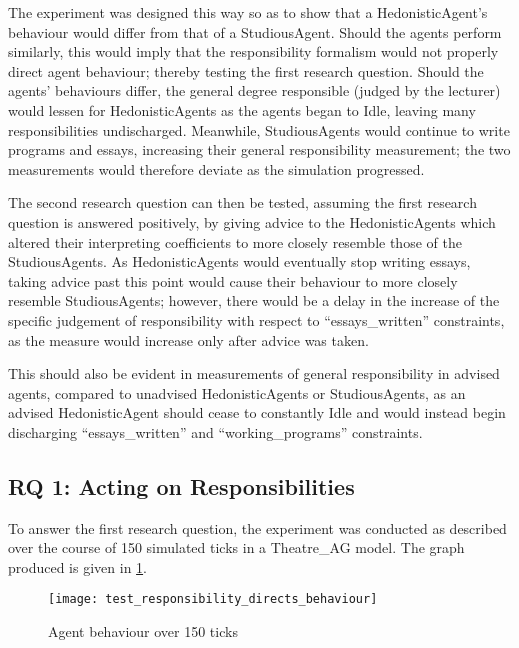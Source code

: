 The experiment was designed this way so as to show that a HedonisticAgent's behaviour would differ from that of a StudiousAgent. Should the agents perform similarly, this would imply that the responsibility formalism would not properly direct agent behaviour; thereby testing the first research question. Should the agents' behaviours differ, the general degree responsible (judged by the lecturer) would lessen for HedonisticAgents as the agents began to Idle, leaving many responsibilities undischarged. Meanwhile, StudiousAgents would continue to write programs and essays, increasing their general responsibility measurement; the two measurements would therefore deviate as the simulation progressed.\par

The second research question can then be tested, assuming the first research question is answered positively, by giving advice to the HedonisticAgents which altered their interpreting coefficients to more closely resemble those of the StudiousAgents. As HedonisticAgents would eventually stop writing essays, taking advice past this point would cause their behaviour to more closely resemble StudiousAgents; however, there would be a delay in the increase of the specific judgement of responsibility with respect to ``essays\_written'' constraints, as the measure would increase only after advice was taken.\par

This should also be evident in measurements of general responsibility in advised agents, compared to unadvised HedonisticAgents or StudiousAgents, as an advised HedonisticAgent should cease to constantly Idle and would instead begin discharging ``essays\_written'' and ``working\_programs'' constraints.\par

\subsection{RQ 1: Acting on Responsibilities}
To answer the first research question, the experiment was conducted as described over the course of 150 simulated ticks in a Theatre\_AG model. The graph produced is given in \cref{fig:1}.

\begin{figure}[h]
    \centering
    \texttt{[image: test\_responsibility\_directs\_behaviour]}
    \caption{Agent behaviour over 150 ticks}
    \label{fig:1}
\end{figure}

